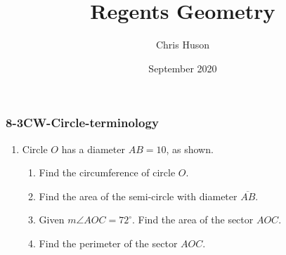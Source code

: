 \documentclass[12pt, twoside]{article}
\title{Regents Geometry}
\author{Chris Huson}
\date{September 2020}
\begin{document}
\subsubsection*{8-3CW-Circle-terminology}
\begin{enumerate}
\item Circle $O$ has a diameter $AB=10$, as shown.
    \begin{center}
  \end{center}
  \begin{enumerate}
    \item Find the circumference of circle $O$. \vspace{2.5cm}
    \item Find the area of the semi-circle with diameter $\overline{AB}$. \vspace{2.5cm}
    \item Given $m\angle AOC=72^\circ$. Find the area of the sector $AOC$. \vspace{2.5cm}
    \item Find the perimeter of the sector $AOC$.
  \end{enumerate}


\end{enumerate}
\end{document}
